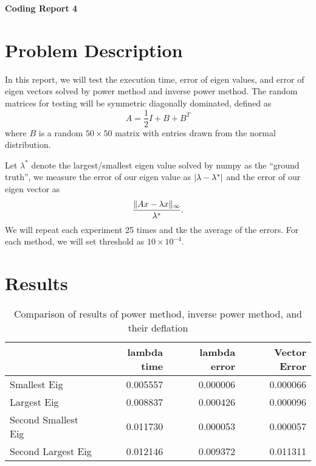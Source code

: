 \documentclass[a4paper,12pt]{article}
\begin{document}
\begin{center} %
	{\Large \bf Coding Report 4} %
	\vspace{2mm}
\end{center}  


\section{Problem Description}

In this report, we will test the execution time, error of eigen values, and error of eigen vectors
solved by power method and inverse power method.
The random matrices for testing will be symmetric diagonally dominated, defined as
$$
A = \frac{1}{2}I + B + B^{T}
$$
where $B$ is a random $50 \times 50$ matrix with entries drawn from the normal distribution.

Let $\lambda^*$ denote the largest/smallest eigen value solved by numpy as the ``ground truth'',
we measure the error of our eigen value as $\lvert\lambda - \lambda^*\rvert$
and the error of our eigen vector as
$$
\frac{\lVert Ax - \lambda x\rVert_{\infty}}{\lambda^*}.
$$
We will repeat each experiment 25 times and tke the average of the errors.
For each method, we will set threshold as $10 \times 10^{-4}$.

\section{Results}

\begin{table}[h]
\begin{center}
	\begin{tabular}{lrrr}
	\toprule
	{} &  lambda time &  lambda error &  Vector Error \\
	\midrule
	Smallest Eig        &     0.005557 &      0.000006 &      0.000066 \\
	Largest Eig         &     0.008837 &      0.000426 &      0.000096 \\
	Second Smallest Eig &     0.011730 &      0.000053 &      0.000057 \\
	Second Largest Eig  &     0.012146 &      0.009372 &      0.011311 \\
	\bottomrule
	\end{tabular}
	\caption{Comparison of results of power method, inverse power method, and their deflation}
\end{center}
\end{table}
\end{document}
